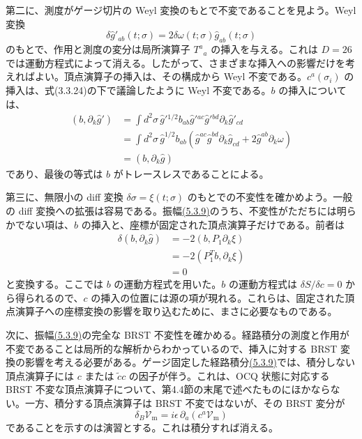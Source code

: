 第二に、測度がゲージ切片の Weyl 変換のもとで不変であることを見よう。Weyl 変換
\begin{equation}
\delta\hat g'_{ab}(t;\sigma)
=2\delta\omega(t;\sigma)\hat g_{ab}(t;\sigma)
\tag{5.4.2}\label{eq:5.4.2}
\end{equation}
のもとで、作用と測度の変分は局所演算子 $T^a{}_a$ の挿入を与える。これは $D=26$ では運動方程式によって消える。したがって、さまざまな挿入への影響だけを考えればよい。頂点演算子の挿入は、その構成から Weyl 不変である。$c^a(\sigma_i)$ の挿入は、式(3.3.24)の下で議論したように Weyl 不変である。$b$ の挿入については、
\begin{equation}
\begin{aligned}
(b,\partial_k\hat g')
&=\int d^2\sigma\,\hat g'{}^{1/2}b_{ab}
\hat g'{}^{ac}\hat g'{}^{bd}\partial_k\hat g'_{cd}\\
&=\int d^2\sigma\,\hat g^{1/2}b_{ab}
\left(\hat g^{ac}\hat g^{bd}\partial_k\hat g_{cd}
+2\hat g^{ab}\partial_k\omega\right)\\
&=(b,\partial_k\hat g)
\end{aligned}
\tag{5.4.3}\label{eq:5.4.3}
\end{equation}
であり、最後の等式は $b$ がトレースレスであることによる。

第三に、無限小の diff 変換 $\delta\sigma=\xi(t;\sigma)$ のもとでの不変性を確かめよう。一般の diff 変換への拡張は容易である。振幅\hyperref[eq:5.3.9]{(5.3.9)}のうち、不変性がただちには明らかでない項は、$b$ の挿入と、座標が固定された頂点演算子だけである。前者は
\begin{equation}
\begin{aligned}
\delta(b,\partial_k\hat g)
&=-2(b,P_1\partial_k\xi)\\
&=-2(P_1^Tb,\partial_k\xi)\\
&=0
\end{aligned}
\tag{5.4.4}\label{eq:5.4.4}
\end{equation}
と変換する。ここでは $b$ の運動方程式を用いた。$b$ の運動方程式は $\delta S/\delta c=0$ から得られるので、$c$ の挿入の位置には源の項が現れる。これらは、固定された頂点演算子への座標変換の影響を取り込むために、まさに必要なものである。


次に、振幅\hyperref[eq:5.3.9]{(5.3.9)}の完全な BRST 不変性を確かめる。経路積分の測度と作用が不変であることは局所的な解析からわかっているので、挿入に対する BRST 変換の影響を考える必要がある。ゲージ固定した経路積分\hyperref[eq:5.3.9]{(5.3.9)}では、積分しない頂点演算子には $c$ または $\tilde c c$ の因子が伴う。これは、OCQ 状態に対応する BRST 不変な頂点演算子について、第4.4節の末尾で述べたものにほかならない。一方、積分する頂点演算子は BRST 不変ではないが、その BRST 変分が
\begin{equation}
\delta_B\mathcal V_{\mathrm m}
=i\epsilon\,\partial_a(c^a\mathcal V_{\mathrm m})
\tag{5.4.5}\label{eq:5.4.5}
\end{equation}
であることを示すのは演習とする。これは積分すれば消える。

